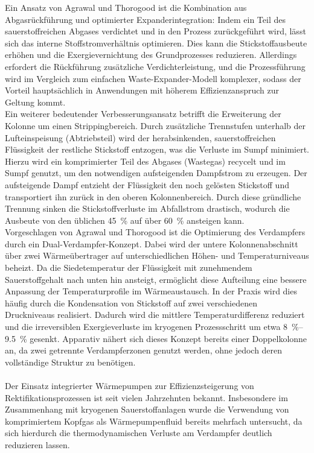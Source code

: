 Ein Ansatz von Agrawal und Thorogood \cite{agrawalProductionMediumPressure1991} ist die Kombination aus Abgasrückführung und optimierter Expanderintegration: Indem ein Teil des sauerstoffreichen Abgases verdichtet und in den Prozess zurückgeführt wird, lässt sich das interne Stoffstromverhältnis optimieren. Dies kann die Stickstoffausbeute erhöhen und die Exergievernichtung des Grundprozesses reduzieren. Allerdings erfordert die Rückführung zusätzliche Verdichterleistung, und die Prozessführung wird im Vergleich zum einfachen Waste-Expander-Modell komplexer, sodass der Vorteil hauptsächlich in Anwendungen mit höherem Effizienzanspruch zur Geltung kommt.\\
Ein weiterer bedeutender Verbesserungsansatz \cite{agrawalProductionMediumPressure1991} betrifft die Erweiterung der Kolonne um einen Strippingbereich. Durch zusätzliche Trennstufen unterhalb der Lufteinspeisung (Abtriebsteil) wird der herabsinkenden, sauerstoffreichen Flüssigkeit der restliche Stickstoff entzogen, was die Verluste im Sumpf minimiert. Hierzu wird ein komprimierter Teil des Abgases (Wastegas) recycelt und im Sumpf genutzt, um den notwendigen aufsteigenden Dampfstrom zu erzeugen. Der aufsteigende Dampf entzieht der Flüssigkeit den noch gelösten Stickstoff und transportiert ihn zurück in den oberen Kolonnenbereich. Durch diese gründliche Trennung sinken die Stickstoffverluste im Abfallstrom drastisch, wodurch die Ausbeute von den üblichen \SI{45}{\percent} auf über \SI{60}{\percent} ansteigen kann. \\
Vorgeschlagen von Agrawal und Thorogood \cite{agrawalProductionMediumPressure1991} ist die Optimierung des Verdampfers durch ein Dual-Verdampfer-Konzept. Dabei wird der untere Kolonnenabschnitt über zwei Wärmeübertrager auf unterschiedlichen Höhen- und Temperaturniveaus beheizt. Da die Siedetemperatur der Flüssigkeit mit zunehmendem Sauerstoffgehalt nach unten hin ansteigt, ermöglicht diese Aufteilung eine bessere Anpassung der Temperaturprofile im Wärmeaustausch. In der Praxis wird dies häufig durch die Kondensation von Stickstoff auf zwei verschiedenen Druckniveaus realisiert. Dadurch wird die mittlere Temperaturdifferenz reduziert und die irreversiblen Exergieverluste im kryogenen Prozessschritt um etwa \SIrange{8}{9.5}{\percent} gesenkt. Apparativ nähert sich dieses Konzept bereits einer Doppelkolonne an, da zwei getrennte Verdampferzonen genutzt werden, ohne jedoch deren vollständige Struktur zu benötigen.\\
\\
Der Einsatz integrierter Wärmepumpen zur Effizienzsteigerung von Rektifikationsprozessen ist seit vielen Jahrzehnten bekannt. Insbesondere im Zusammenhang mit kryogenen Sauerstoffanlagen wurde die Verwendung von komprimiertem Kopfgas als Wärmepumpenfluid bereits mehrfach untersucht, da sich hierdurch die thermodynamischen Verluste am Verdampfer deutlich reduzieren lassen.\\
